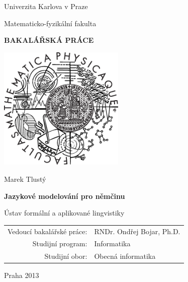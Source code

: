 \documentclass[12pt,a4paper]{report}
\begin{document}


\pagestyle{empty}
\begin{center}

\large

Univerzita Karlova v Praze

\medskip

Matematicko-fyzikální fakulta

\vfill

{\bf\Large BAKALÁŘSKÁ PRÁCE}

\vfill

\centerline{\mbox{\includegraphics[width=60mm]{./img/logo.eps}}}

\vfill
\vspace{5mm}

{\LARGE Marek Tlustý}

\vspace{15mm}

{\LARGE\bfseries Jazykové modelování pro němčinu}

\vfill

Ústav formální a aplikované lingvistiky

\vfill

\begin{tabular}{rl}

Vedoucí bakalářské práce: & RNDr. Ondřej Bojar, Ph.D. \\
\noalign{\vspace{2mm}}
Studijní program: & Informatika \\
\noalign{\vspace{2mm}}
Studijní obor: & Obecná informatika \\
\end{tabular}

\vfill

Praha 2013

\end{center}
\end{document}
